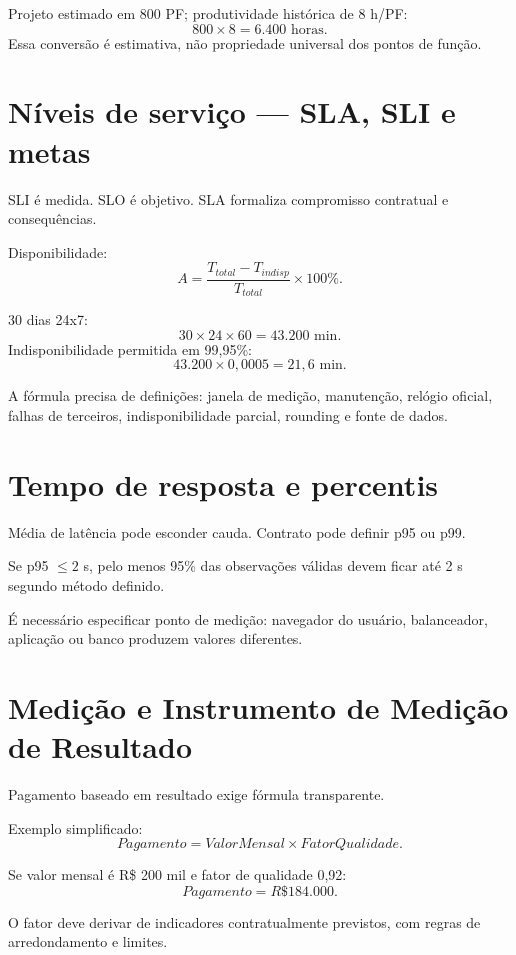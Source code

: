 \begin{exemplo}[estimativa]
Projeto estimado em 800 PF; produtividade histórica de 8 h/PF:
\[
800\times8=6.400\text{ horas}.
\]
Essa conversão é estimativa, não propriedade universal dos pontos de função.
\end{exemplo}

\section{Níveis de serviço — SLA, SLI e metas}

SLI é medida. SLO é objetivo. SLA formaliza compromisso contratual e consequências.

Disponibilidade:
\[
A=\frac{T_{total}-T_{indisp}}{T_{total}}\times100\%.
\]

\begin{exemplo}[99,95\%]
30 dias 24x7:
\[
30\times24\times60=43.200\text{ min}.
\]
Indisponibilidade permitida em 99,95\%:
\[
43.200\times0{,}0005=21{,}6\text{ min}.
\]
\end{exemplo}

A fórmula precisa de definições: janela de medição, manutenção, relógio oficial, falhas de terceiros, indisponibilidade parcial, rounding e fonte de dados.

\section{Tempo de resposta e percentis}

Média de latência pode esconder cauda. Contrato pode definir p95 ou p99.

Se p95 $\leq 2$ s, pelo menos 95\% das observações válidas devem ficar até 2 s segundo método definido.

É necessário especificar ponto de medição: navegador do usuário, balanceador, aplicação ou banco produzem valores diferentes.

\section{Medição e Instrumento de Medição de Resultado}

Pagamento baseado em resultado exige fórmula transparente.

Exemplo simplificado:
\[
Pagamento=ValorMensal\times FatorQualidade.
\]

Se valor mensal é R\$ 200 mil e fator de qualidade 0,92:
\[
Pagamento=R\$184.000.
\]

O fator deve derivar de indicadores contratualmente previstos, com regras de arredondamento e limites.

